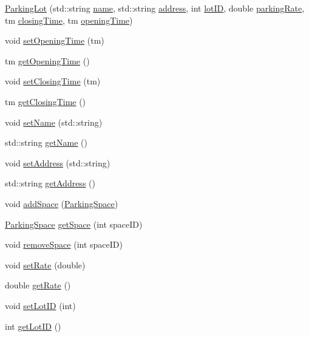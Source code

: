 \begin{DoxyCompactItemize}
\mbox{\hyperlink{class_parking_lot_af06c47fd4a50e7b2215cf2867876cc0c}{Parking\+Lot}} (std\+::string \mbox{\hyperlink{class_parking_lot_aaef3c99a2d6e7398325db451183c9cae}{name}}, std\+::string \mbox{\hyperlink{class_parking_lot_a0a2cd92fd4fb8e78530613df950a44bb}{address}}, int \mbox{\hyperlink{class_parking_lot_aa8002685719766c66877ab35d4f80f17}{lot\+ID}}, double \mbox{\hyperlink{class_parking_lot_a1b80d2bddbd40ebe71d8b89a00410e03}{parking\+Rate}}, tm \mbox{\hyperlink{class_parking_lot_ae3607cdf93ec2858e0ce1214c950b255}{closing\+Time}}, tm \mbox{\hyperlink{class_parking_lot_af6162bf724fb438c5c703989ce0bd10a}{opening\+Time}})
\item 
void \mbox{\hyperlink{class_parking_lot_accb1a328bc13823a502e27d099e4d724}{set\+Opening\+Time}} (tm)
\item 
tm \mbox{\hyperlink{class_parking_lot_a08f4debc52d08ef0050c81e18a5759e5}{get\+Opening\+Time}} ()
\item 
void \mbox{\hyperlink{class_parking_lot_a1406d44ee8d0dcb0c192176d706b437c}{set\+Closing\+Time}} (tm)
\item 
tm \mbox{\hyperlink{class_parking_lot_a645ab3d930184975d74814aea73cd684}{get\+Closing\+Time}} ()
\item 
void \mbox{\hyperlink{class_parking_lot_af51fbe3b4f7aa25f69f44277d7e9394c}{set\+Name}} (std\+::string)
\item 
std\+::string \mbox{\hyperlink{class_parking_lot_a4d1dc6ef9517b87a9bfff1fd64c8cb41}{get\+Name}} ()
\item 
void \mbox{\hyperlink{class_parking_lot_addf77ed29c0befc4ad0ff5cae838fd35}{set\+Address}} (std\+::string)
\item 
std\+::string \mbox{\hyperlink{class_parking_lot_ab98122d5436d034705ac94f09fde28ae}{get\+Address}} ()
\item 
void \mbox{\hyperlink{class_parking_lot_a993a56b286a57424100cb90f815847a1}{add\+Space}} (\mbox{\hyperlink{class_parking_space}{Parking\+Space}})
\item 
\mbox{\hyperlink{class_parking_space}{Parking\+Space}} \mbox{\hyperlink{class_parking_lot_ae9420690a078541084aa1fcb35f644fc}{get\+Space}} (int space\+ID)
\item 
void \mbox{\hyperlink{class_parking_lot_a2ff1620a479383eb08ffa33474c41c22}{remove\+Space}} (int space\+ID)
\item 
void \mbox{\hyperlink{class_parking_lot_a0e8557c93fba850a9cdbd9e76d49a3eb}{set\+Rate}} (double)
\item 
double \mbox{\hyperlink{class_parking_lot_abd4aba799c6f13e467ed0b5e17ef70eb}{get\+Rate}} ()
\item 
void \mbox{\hyperlink{class_parking_lot_a10ff48e3483395f5fa7fd15a80913515}{set\+Lot\+ID}} (int)
\item 
int \mbox{\hyperlink{class_parking_lot_ac6269a82ab516553047cefacc229e5e0}{get\+Lot\+ID}} ()
\end{DoxyCompactItemize}
